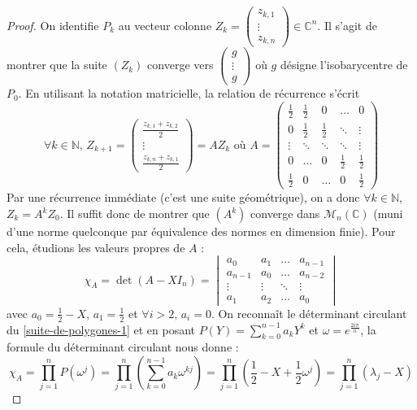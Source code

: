 	\begin{proof}
		On identifie $P_k$ au vecteur colonne $Z_k = \begin{pmatrix} z_{k,1} \\ \vdots \\ z_{k,n} \end{pmatrix} \in \mathbb{C}^n$. Il s'agit de montrer que la suite $(Z_k)$ converge vers $\begin{pmatrix} g \\ \vdots \\ g \end{pmatrix}$ où $g$ désigne l'isobarycentre de $P_0$.
		\newpar
		En utilisant la notation matricielle, la relation de récurrence s'écrit
		\[ \forall k \in \mathbb{N}, \, Z_{k+1} = \begin{pmatrix} \frac{z_{k,1} + z_{k,2}}{2} \\ \vdots \\ \frac{z_{k,n} + z_{k,1}}{2} \end{pmatrix} = AZ_k \text{ où } A = \begin{pmatrix} \frac{1}{2} & \frac{1}{2} & 0 & \dots & 0 \\ 0 & \frac{1}{2} & \frac{1}{2} & \ddots & \vdots \\ \vdots & \ddots & \ddots & \ddots & \vdots \\ 0 & \dots & 0 & \frac{1}{2} & \frac{1}{2} \\ \frac{1}{2} & 0 & \dots & 0 & \frac{1}{2} \end{pmatrix} \]
		Par une récurrence immédiate (c'est une suite géométrique), on a donc $\forall k \in \mathbb{N}$, $Z_k = A^k Z_0$. Il suffit donc de montrer que $(A^k)$ converge dans $\mathcal{M}_n(\mathbb{C})$ (muni d'une norme quelconque par équivalence des normes en dimension finie).
		\newpar
		Pour cela, étudions les valeurs propres de $A$ :
		\[ \chi_A = \det(A - X I_n) = \begin{vmatrix} a_0 & a_1 & \dots & a_{n-1} \\ a_{n-1} & a_0 & \dots & a_{n-2}\\ \vdots & \vdots & \ddots & \vdots \\ a_1 & a_2 & \dots & a_0 \end{vmatrix} \]
		avec $a_0 = \frac{1}{2} - X$, $a_1 = \frac{1}{2}$ et $\forall i > 2, \, a_i = 0$. On reconnaît le déterminant circulant du \cref{suite-de-polygones-1} et en posant $P(Y) = \sum_{k=0}^{n-1} a_k Y^k$ et $\omega = e^{\frac{2i\pi}{n}}$, la formule du déterminant circulant nous donne :
		\[ \chi_A = \prod_{j=1}^n P(\omega^j) = \prod_{j=1}^n \left( \sum_{k=0}^{n-1} a_k \omega^{kj} \right) = \prod_{j=1}^n \left( \frac{1}{2} - X + \frac{1}{2} \omega^j \right) = \prod_{j=1}^n (\lambda_j - X) \]

\end{proof}
